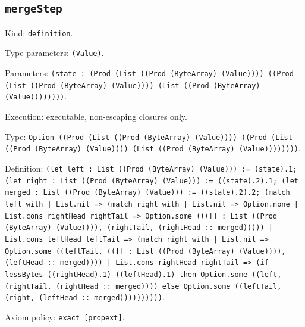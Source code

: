 \documentclass[11pt]{article}
\begin{document}
\subsection*{\texttt{mergeStep}}
\noindent Kind: \texttt{definition}.\par
\noindent Type parameters: \texttt{(Value)}.\par
\noindent Parameters: \texttt{(state : (Prod (List ((Prod (ByteArray) (Value)))) ((Prod (List ((Prod (ByteArray) (Value)))) (List ((Prod (ByteArray) (Value))))))))}.\par
\noindent Execution: executable, non-escaping closures only.\par
\noindent Type: \texttt{Option ((Prod (List ((Prod (ByteArray) (Value)))) ((Prod (List ((Prod (ByteArray) (Value)))) (List ((Prod (ByteArray) (Value))))))))}.\par
\noindent Definition: \texttt{(let left : List ((Prod (ByteArray) (Value))) := (state).1; (let right : List ((Prod (ByteArray) (Value))) := ((state).2).1; (let merged : List ((Prod (ByteArray) (Value))) := ((state).2).2; (match left with | List.nil => (match right with | List.nil => Option.none | List.cons rightHead rightTail => Option.some ((([] : List ((Prod (ByteArray) (Value)))), (rightTail, (rightHead :: merged))))) | List.cons leftHead leftTail => (match right with | List.nil => Option.some ((leftTail, (([] : List ((Prod (ByteArray) (Value)))), (leftHead :: merged)))) | List.cons rightHead rightTail => (if lessBytes ((rightHead).1) ((leftHead).1) then Option.some ((left, (rightTail, (rightHead :: merged)))) else Option.some ((leftTail, (right, (leftHead :: merged))))))))))}.\par
\noindent Axiom policy: \texttt{exact [propext]}.\par
\end{document}
